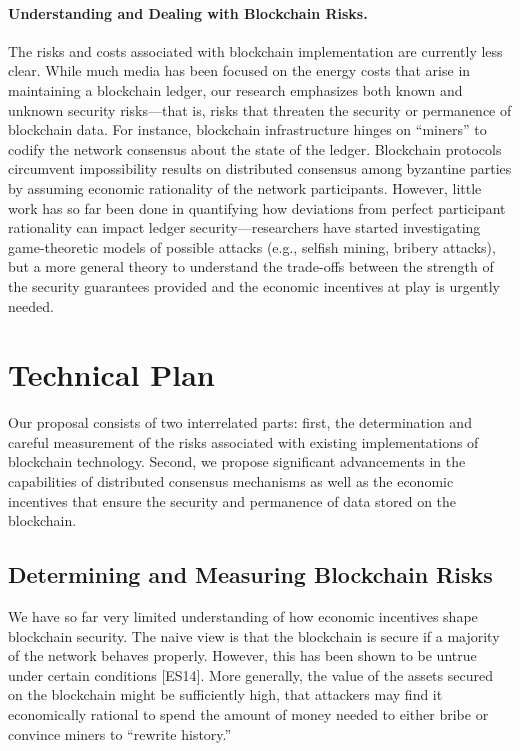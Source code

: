 \documentclass[runningheads, 12pt]{article}
\begin{document}
\vspace{-5pt}
\paragraph{Understanding and Dealing with Blockchain Risks.} The risks and costs associated with blockchain implementation are currently less clear. While much media has been focused on the energy costs that arise in maintaining a blockchain ledger, our research emphasizes both known and unknown security risks---that is, risks that threaten the security or permanence of blockchain data. For instance, blockchain infrastructure hinges on “miners” to codify the network consensus about the state of the ledger. Blockchain protocols circumvent impossibility results on distributed consensus among byzantine parties by assuming economic rationality of the network participants. However, little work has so far been done in quantifying how deviations from perfect participant rationality can impact ledger security---researchers have started investigating game-theoretic models of possible attacks (e.g., selfish mining, bribery attacks), but a more general theory to understand the trade-offs between the strength of the security guarantees provided and the economic incentives at play is urgently needed.


\vspace{-5pt}
\section{Technical Plan}
\vspace{-4pt}

Our proposal consists of two interrelated parts: first, the determination and careful measurement of the risks associated with existing implementations of blockchain technology. Second, we propose significant advancements in the capabilities of distributed consensus mechanisms as well as the economic incentives that ensure the security and permanence of data stored on the blockchain.

\vspace{-4pt}
\subsection{Determining and Measuring Blockchain Risks}
\vspace{-3pt}

We have so far very limited understanding of how economic incentives shape blockchain security. The naive view is that the blockchain is secure if a majority of the network behaves properly. However, this has been shown to be untrue under certain conditions [ES14]. More generally, the value of the assets secured on the blockchain might be sufficiently high, that attackers may find it economically rational to spend the amount of money needed to either bribe or convince miners to “rewrite history.”
\end{document}
